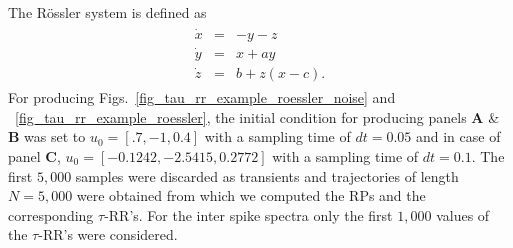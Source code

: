 \documentclass[entropy,article,submit,pdftex,moreauthors]{Definitions/mdpi}
\begin{document}
\noindent The R\"ossler system \cite{roessler1976} is defined as
\begin{align}
\begin{array}{rcl}
\dot{x}&=&-y-z \\
\dot{y}&=&x+ay \\
\dot{z}&=&b+ z(x-c) .
\end{array}
\label{eq_model_roessler}
\end{align}
For producing Figs.~\ref{fig_tau_rr_example_roessler_noise} and ~\ref{fig_tau_rr_example_roessler}, the initial condition for producing panels \textbf{A} \& \textbf{B} was set to $u_0=[.7, -1, 0.4]$ with a sampling time 
of $dt=0.05$ and in case of panel \textbf{C}, $u_0=[-0.1242, -2.5415, 0.2772]$ with a sampling time of $dt=0.1$. The first $5,000$ samples were discarded as transients and trajectories of length $N=5,000$ were 
obtained from which we computed the RPs and the corresponding $\tau$-RR's. For the inter spike spectra only the first $1,000$ values of the $\tau$-RR's were considered.
 
\end{document}
